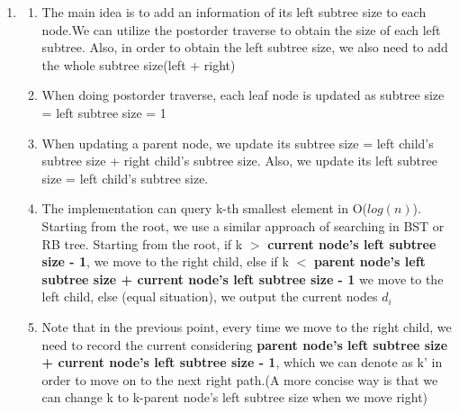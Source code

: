 \documentclass{article}
\begin{document}
\begin{CJK*}{UTF8}{bsmi}
\begin{enumerate}
    \item  
    \begin{enumerate}
        \item The main idea is to add an information of its left subtree size to each node.We can utilize the postorder traverse to obtain the size of each left subtree. Also, in order to obtain the left subtree size, we also need to add the whole subtree size(left + right)
        \item When doing postorder traverse, each leaf node is updated as subtree size = left subtree size
         = 1 
        \item When updating a parent node, we update its subtree size = left child's subtree size + right child's subtree size. Also, we update its left subtree size = left child's subtree size.
        \item The implementation can query k-th smallest element in O($log(n)$). Starting from the root, we use a similar approach of searching in BST or RB tree. Starting from the root, if k $>$ \textbf{current node's left subtree size - 1}, we move to the right child, else if k $<$ \textbf{parent node's left subtree size + current node's left subtree size - 1} we move to the left child, else (equal situation), we output the current nodes $d_i$
        \item Note that in the previous point, every time we move to the right child, we need to record the current considering \textbf{parent node's left subtree size + current node's left subtree size - 1}, which we can denote as k' in order to move on to the next right path.(A more concise way is that we can change k to k-parent node's left subtree size when we move right)
    \end{enumerate}
 

\end{enumerate}
\end{CJK*}
\end{document}
